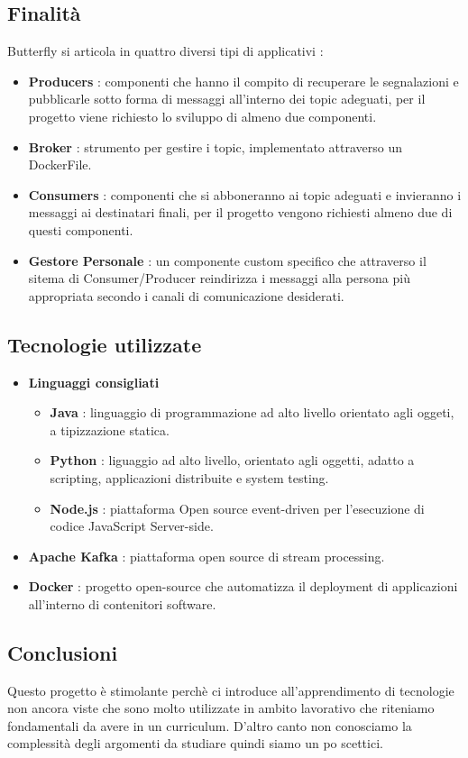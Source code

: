 \documentclass{article}
\begin{document}
		\subsection{Finalità}
			Butterfly si articola in quattro diversi tipi di applicativi :
			\begin{itemize}
				\item \textbf{Producers} : componenti che hanno il compito di recuperare le segnalazioni e pubblicarle sotto forma di messaggi all'interno dei topic adeguati, per il progetto viene richiesto lo sviluppo di almeno due componenti.
				\item \textbf{Broker} : strumento per gestire i topic, implementato attraverso un DockerFile.
				\item \textbf{Consumers} : componenti che si abboneranno ai topic adeguati e invieranno i messaggi ai destinatari finali, per il progetto vengono richiesti almeno due di questi componenti.
				\item \textbf{Gestore Personale} : un componente custom specifico che attraverso il sitema di Consumer/Producer reindirizza i messaggi alla persona più appropriata secondo i canali di comunicazione desiderati.
			\end{itemize}
		\subsection{Tecnologie utilizzate}
			\begin{itemize}
				\item \textbf{Linguaggi consigliati}
					\begin{itemize}
						\item \textbf{Java} : linguaggio di programmazione ad alto livello orientato agli oggeti, a tipizzazione statica.
						\item \textbf{Python} : liguaggio ad alto livello, orientato agli oggetti, adatto a scripting, applicazioni distribuite e system testing.
						\item \textbf{Node.js} : piattaforma Open source event-driven per l'esecuzione di codice JavaScript Server-side.
				\end{itemize}	
			\item \textbf{Apache Kafka} : piattaforma open source di stream processing.
			\item \textbf{Docker} : progetto open-source che automatizza il deployment di applicazioni all'interno di contenitori software.
			\end{itemize}
		\subsection{Conclusioni}
			Questo progetto è stimolante perchè ci introduce all'apprendimento di tecnologie non ancora viste che sono molto utilizzate in ambito lavorativo che riteniamo fondamentali da avere in un curriculum. 
			D'altro canto non conosciamo la complessità degli argomenti da studiare quindi siamo un po scettici.
		
\end{document}
